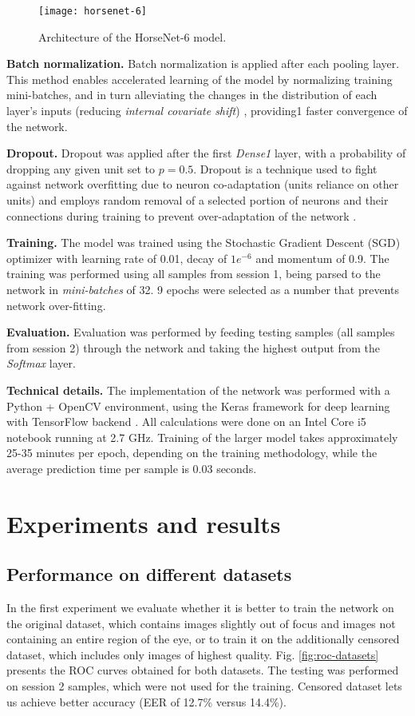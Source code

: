 \documentclass[10pt,twocolumn,letterpaper]{article}
\begin{document}
\begin{figure}[!h]
\centering
\texttt{[image: horsenet-6]}
\vskip4mm
\caption{Architecture of the HorseNet-6 model.}
\label{fig:architecture-6}
\end{figure}

\textbf{Batch normalization.} Batch normalization is applied after each pooling layer. This method enables accelerated learning of the model by normalizing training mini-batches, and in turn alleviating the changes in the distribution of each layer's inputs (reducing \emph{internal covariate shift}) \cite{BatchNormalization}, providing1 faster convergence of the network.
   
\textbf{Dropout.} Dropout was applied after the first \emph{Dense1} layer, with a probability of dropping any given unit set to $p=0.5$. Dropout is a technique used to fight against network overfitting due to neuron co-adaptation (units reliance on other units) and employs random removal of a selected portion of neurons and their connections during training to prevent over-adaptation of the network \cite{Dropout}.

\textbf{Training.} The model was trained using the Stochastic Gradient Descent (SGD) optimizer with learning rate of 0.01, decay of $1e^{-6}$ and momentum of 0.9. The training was performed using all samples from session 1, being parsed to the network in \emph{mini-batches} of 32. 9 epochs were selected as a number that prevents network over-fitting.

\textbf{Evaluation.} Evaluation was performed by feeding testing samples (all samples from session 2) through the network and taking the highest output from the \emph{Softmax} layer.

\textbf{Technical details.} The implementation of the network was performed with a Python \cite{Python} + OpenCV \cite{opencv_library} environment, using the Keras framework for deep learning \cite{Keras} with TensorFlow backend \cite{tensorflow2015}. All calculations were done on an Intel Core i5 notebook running at 2.7 GHz. Training of the larger model takes approximately 25-35 minutes per epoch, depending on the training methodology, while the average prediction time per sample is 0.03 seconds.

\section{Experiments and results}
\label{sec:Experiments}
\subsection{Performance on different datasets}
In the first experiment we evaluate whether it is better to train the network on the original dataset, which contains images slightly out of focus and images not containing an entire region of the eye, or to train it on the additionally censored dataset, which includes only images of highest quality. Fig. \ref{fig:roc-datasets} presents the ROC curves obtained for both datasets. The testing was performed on session 2 samples, which were not used for the training. Censored dataset lets us achieve better accuracy (EER of 12.7\% versus 14.4\%).
\end{document}
